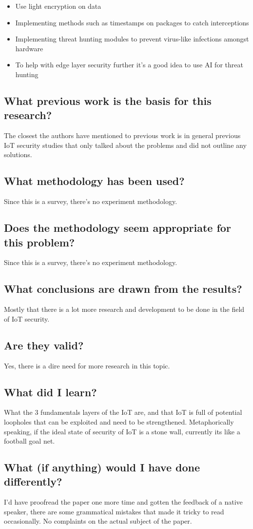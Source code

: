 \documentclass[11pt,a4paper]{article}
\begin{document}
\begin{itemize}
    \item Use light encryption on data
    \item Implementing methods such as timestamps on packages to catch interceptions 
    \item Implementing threat hunting modules to prevent virus-like infections amongst hardware 
    \item To help with edge layer security further it’s a good idea to use AI for threat hunting 
\end{itemize}

\subsection*{What previous work is the basis for this research?}
The closest the authors have mentioned to previous work is in general previous IoT security studies that only talked about the problems and did not outline any solutions. 

\subsection*{What methodology has been used?}
Since this is a survey, there’s no experiment methodology. 

\subsection*{Does the methodology seem appropriate for this problem?}
Since this is a survey, there’s no experiment methodology.

\subsection*{What conclusions are drawn from the results?}
Mostly that there is a lot more research and development to be done in the field of IoT security.

\subsection*{Are they valid?}
Yes, there is a dire need for more research in this topic.

\subsection*{What did I learn?}
What the 3 fundamentals layers of the IoT are, and that IoT is full of potential loopholes that can be exploited and need to be strengthened. Metaphorically speaking, if the ideal state of security of IoT is a stone wall, currently its like a football goal net. 

\subsection*{What (if anything) would I have done differently?}
I’d have proofread the paper one more time and gotten the feedback of a native speaker, there are some grammatical mistakes that made it tricky to read occasionally. No complaints on the actual subject of the paper.
\end{document}
